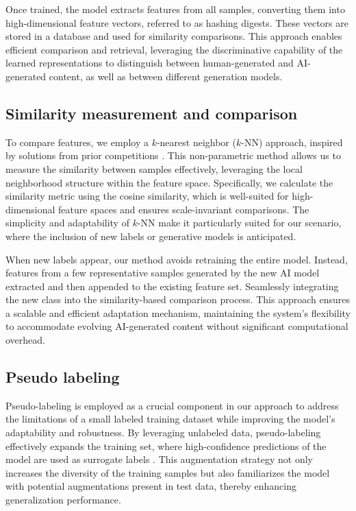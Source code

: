 Once trained, the model extracts features from all samples, converting them into high-dimensional feature vectors, referred to as hashing digests. These vectors are stored in a database and used for similarity comparisons. This approach enables efficient comparison and retrieval, leveraging the discriminative capability of the learned representations to distinguish between human-generated and AI-generated content, as well as between different generation models.

\subsection{Similarity measurement and comparison}
\label{sec:similarity}
To compare features, we employ a $k$-nearest neighbor ($k$-NN) approach, inspired by solutions from prior competitions \cite{toofanee2023dfu, jeon20201st}. This non-parametric method allows us to measure the similarity between samples effectively, leveraging the local neighborhood structure within the feature space. Specifically, we calculate the similarity metric using the cosine similarity, which is well-suited for high-dimensional feature spaces and ensures scale-invariant comparisons. The simplicity and adaptability of $k$-NN make it particularly suited for our scenario, where the inclusion of new labels or generative models is anticipated.

When new labels appear, our method avoids retraining the entire model. Instead, features from a few representative samples generated by the new AI model extracted and then appended to the existing feature set. Seamlessly integrating the new class into the similarity-based comparison process. This approach ensures a scalable and efficient adaptation mechanism, maintaining the system's flexibility to accommodate evolving AI-generated content without significant computational overhead.


\subsection{Pseudo labeling}
\label{sec:pseudo}
Pseudo-labeling is employed as a crucial component in our approach to address the limitations of a small labeled training dataset while improving the model's adaptability and robustness. By leveraging unlabeled data, pseudo-labeling effectively expands the training set, where high-confidence predictions of the model are used as surrogate labels \cite{cascante2021curriculum}. This augmentation strategy not only increases the diversity of the training samples but also familiarizes the model with potential augmentations present in test data, thereby enhancing generalization performance.

